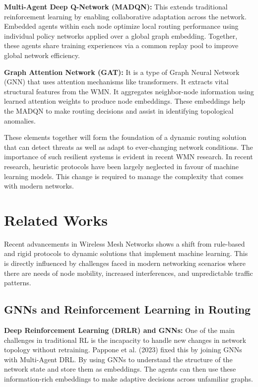 \documentclass[conference]{IEEEtran}
\begin{document}
\textbf{Multi-Agent Deep Q-Network (MADQN):} This extends traditional reinforcement learning by enabling collaborative adaptation across the network. Embedded agents within each node optimize local routing performance using individual policy networks applied over a global graph embedding. Together, these agents share training experiences via a common replay pool to improve global network efficiency.

\textbf{Graph Attention Network (GAT):} It is a type of Graph Neural Network (GNN) that uses attention mechanisms like transformers. It extracts vital structural features from the WMN. It aggregates neighbor-node information using learned attention weights to produce node embeddings. These embeddings help the MADQN to make routing decisions and assist in identifying topological anomalies.

These elements together will form the foundation of a dynamic routing solution that can detect threats as well as adapt to ever-changing network conditions. The importance of such resilient systems is evident in recent WMN research. In recent research, heuristic protocols have been largely neglected in favour of machine learning models. This change is required to manage the complexity that comes with modern networks.

\section{Related Works}

Recent advancements in Wireless Mesh Networks shows a shift from rule-based and rigid protocols to dynamic solutions that implement machine learning. This is directly influenced by challenges faced in modern networking scenarios where there are needs of node mobility, increased interferences, and unpredictable traffic patterns.

\subsection{GNNs and Reinforcement Learning in Routing}

\textbf{Deep Reinforcement Learning (DRLR) and GNNs:} One of the main challenges in traditional RL is the incapacity to handle new changes in network topology without retraining. Pappone et al. (2023) fixed this by joining GNNs with Multi-Agent DRL. By using GNNs to understand the structure of the network state and store them as embeddings. The agents can then use these information-rich embeddings to make adaptive decisions across unfamiliar graphs.
\end{document}
